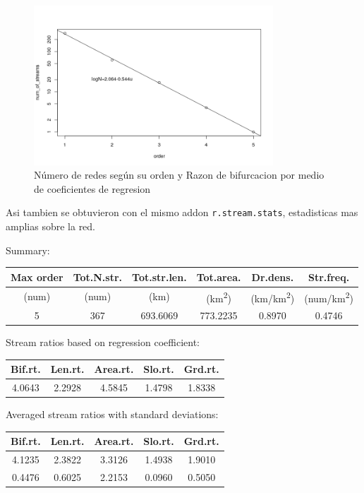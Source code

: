 \documentclass[11pt,]{article}
\begin{document}
\begin{figure}
\centering
\includegraphics[width=0.80000\textwidth]{Numero de red segun su orden.png}
\caption{Número de redes según su orden y Razon de bifurcacion por medio
de coeficientes de regresion\label{grafnumero}}
\end{figure}

Asi tambien se obtuvieron con el mismo addon \texttt{r.stream.stats},
estadisticas mas amplias sobre la red.

Summary:

\begin{longtable}[]{@{}cccccc@{}}
\toprule
Max order & Tot.N.str. & Tot.str.len. & Tot.area. & Dr.dens. &
Str.freq.\tabularnewline
\midrule
\endhead
(num) & (num) & (km) & (km\textsuperscript{2}) &
(km/km\textsuperscript{2}) & (num/km\textsuperscript{2})\tabularnewline
5 & 367 & 693.6069 & 773.2235 & 0.8970 & 0.4746\tabularnewline
\bottomrule
\end{longtable}

Stream ratios based on regression coefficient:

\begin{longtable}[]{@{}ccccc@{}}
\toprule
Bif.rt. & Len.rt. & Area.rt. & Slo.rt. & Grd.rt.\tabularnewline
\midrule
\endhead
4.0643 & 2.2928 & 4.5845 & 1.4798 & 1.8338\tabularnewline
\bottomrule
\end{longtable}

Averaged stream ratios with standard deviations:

\begin{longtable}[]{@{}ccccc@{}}
\toprule
Bif.rt. & Len.rt. & Area.rt. & Slo.rt. & Grd.rt.\tabularnewline
\midrule
\endhead
4.1235 & 2.3822 & 3.3126 & 1.4938 & 1.9010\tabularnewline
0.4476 & 0.6025 & 2.2153 & 0.0960 & 0.5050\tabularnewline
\bottomrule
\end{longtable}
\end{document}
